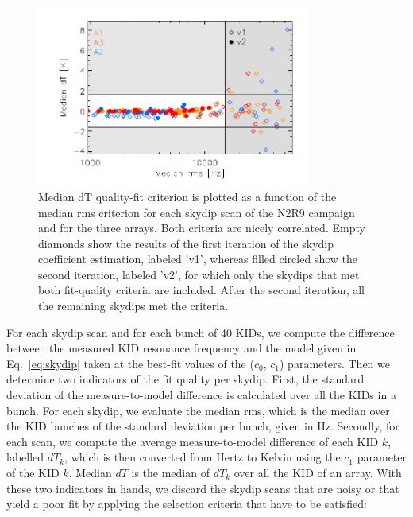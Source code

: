\begin{figure}[ht!]
\begin{center}
\includegraphics[clip=true,width=0.8\textwidth]{Figures/Opacity/plot_skydip_selection_two_crit.pdf}
\caption[N2R9 skydip scan selection.]{ Median dT quality-fit criterion
is plotted as a function of the median rms criterion for each skydip
scan of the N2R9 campaign and for the three arrays. Both criteria are
nicely correlated. Empty diamonds show the results of the first
iteration of the skydip coefficient estimation, labeled 'v1', whereas
filled circled show the second iteration, labeled 'v2', for which only the skydips
that met both fit-quality criteria are included.
After the second iteration, all the remaining skydips met the criteria.}
\label{fig:skydipselection}
\end{center}
\end{figure}

For each skydip scan and for each bunch of 40 KIDs, we compute the
difference between the measured KID resonance frequency and the model
given in Eq.~\ref{eq:skydip} taken at the best-fit values of the
($c_0$, $c_1$) parameters. Then we determine two indicators of the fit
quality per skydip. First, the standard deviation of the
measure-to-model difference is calculated over all the KIDs in a
bunch. For each skydip, we evaluate the median rms, which is the
median over the KID bunches of the standard deviation per bunch, given
in Hz. Secondly, for each scan, we compute the average
measure-to-model difference of each KID $k$, labelled $dT_k$, which is
then converted from Hertz to Kelvin using the $c_1$ parameter of the
KID $k$. Median $dT$ is the median of $dT_k$ over all the KID of an
array. With these two indicators in hands, we discard the skydip scans
that are noisy or that yield a poor fit by applying the selection
criteria that have to be satisfied:

